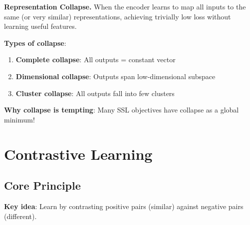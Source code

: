 \textbf{Representation Collapse.} When the encoder learns to map all inputs to the same (or very similar) representations, achieving trivially low loss without learning useful features.

\textbf{Types of collapse}:
\begin{enumerate}
    \item \textbf{Complete collapse}: All outputs = constant vector
    \item \textbf{Dimensional collapse}: Outputs span low-dimensional subspace
    \item \textbf{Cluster collapse}: All outputs fall into few clusters
\end{enumerate}

\textbf{Why collapse is tempting}: Many SSL objectives have collapse as a global minimum!

\section{Contrastive Learning}
\label{sec:contrastive_learning}

\subsection{Core Principle}

\textbf{Key idea}: Learn by contrasting positive pairs (similar) against negative pairs (different).

